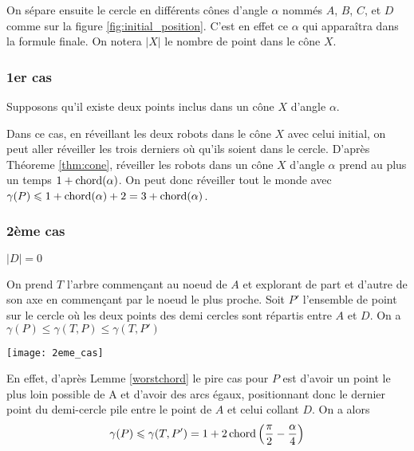   On sépare ensuite le cercle en différents cônes d'angle $\alpha$ nommés $A$,
  $B$, $C$, et $D$ comme sur la figure \ref{fig:initial_position}. C'est en
  effet ce $\alpha$ qui apparaîtra dans la formule finale. On notera $|X|$ le
  nombre de point dans le cône $X$.

\subsubsection*{1er cas}\label{1cas} Supposons qu'il existe deux points inclus
dans un cône $X$ d'angle $\alpha$.

Dans ce cas, en réveillant les deux robots dans le cône $X$ avec celui initial,
on peut aller réveiller les trois derniers où qu'ils soient dans le
cercle.  D'après Théoreme \ref{thm:cone}, réveiller les robots dans
un cône $X$ d'angle $\alpha$ prend au plus un temps $1 + \operatorname{chord}(\alpha)$.  On
peut donc réveiller tout le monde avec
$\gamma(P) \leqslant 1 + \operatorname{chord}(\alpha) + 2 = 3 + \operatorname{chord}(\alpha)$.

\subsubsection*{2ème cas}\label{2cas} $|D| = 0$

On prend $T$ l'arbre commençant au noeud de $A$ et explorant de part et d'autre de son axe en commençant par le noeud le plus proche.
Soit $P'$ l'ensemble de point sur le cercle où les deux points des demi cercles sont répartis entre $A$ et $D$.
On a $\gamma(P) \leq  \gamma(T, P) \leq \gamma(T, P')$

  \texttt{[image: 2eme\_cas]}

En effet, d'après Lemme \ref{worstchord} le pire cas pour $P$ est d'avoir un point le plus loin possible de A et d'avoir des arcs égaux, positionnant donc le dernier point du demi-cercle pile entre le point de $A$ et celui collant $D$. On a alors
$$\gamma(P) \leqslant \gamma(T, P') = 1 + 2\operatorname{chord}\left(\frac{\pi}{2} -
  \frac{\alpha}{4}\right)$$

